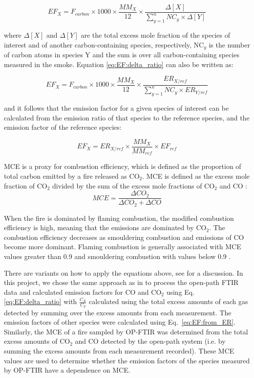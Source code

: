 \documentclass[acp, manuscript]{copernicus}
\begin{document}
\begin{equation} \label{eq:EF:delta_ratio}
EF_X = F_{carbon} \times 1000 \times \frac{MM_X}{12} \times \frac{\Delta[X]}{\sum_{y=1}^{n} NC_y \times \Delta[Y]}
\end{equation}

where $\Delta[X]$ and $\Delta[Y]$ are the total excess mole fraction of the species of interest and of another carbon-containing species, respectively, NC$_y$ is the number of carbon atoms in species Y and the sum is over all carbon-containing species measured in the smoke. 
Equation \ref{eq:EF:delta_ratio} can also be written as:

\begin{equation}
EF_X = F_{carbon} \times 1000 \times \frac{MM_X}{12} \times \frac{ER_{X/ref}}{\sum_{y=1}^{n} NC_y \times ER_{Y/ref}}
\end{equation}

and it follows that the emission factor for a given species of interest can be calculated from the emission ratio of that species to the reference species, and the emission factor of the reference species:

\begin{equation} \label{eq:EF:from_ER}
EF_X = ER_{X/ref} \times \frac{MM_X}{MM_{ref}} \times EF_{ref}
\end{equation}


MCE is a proxy for combustion efficiency, which is defined as the proportion of total carbon emitted by a fire released as CO$_2$. MCE is defined as the excess mole fraction of CO$_2$ divided by the sum of the excess mole fractions of CO$_2$ and CO \citep{Hao1993,Yokelson1996}:
\begin{equation} \label{eq:MCE}
MCE = \frac{\Delta CO_2}{\Delta CO_2 + \Delta CO}
\end{equation}
 
When the fire is dominated by flaming combustion, the modified combustion efficiency is high, meaning that the emissions are dominated by CO$_2$. The combustion efficiency decreases as smouldering combustion and emissions of CO become more dominant. Flaming combustion is generally associated with MCE values greater than 0.9 and smouldering combustion with values below 0.9 \citep{Yokelson1996, Bertschi2003}.

There are variants on how to apply the equations above, see \citet{Paton-Walsh2014} for a discussion. In this project, we chose the same approach as in \citet{Paton-Walsh2014} to process the open-path FTIR data and calculated emission factors for CO and CO$_2$ using Eq. \ref{eq:EF:delta_ratio} with $ \frac{C_X}{C_T} $ calculated using the total excess amounts of each gas detected by summing over the excess amounts from each measurement. The emission factors of other species were calculated using Eq.~\ref{eq:EF:from_ER}.
Similarly, the MCE of a fire sampled by OP-FTIR was determined from the total excess amounts of CO$_2$ and CO detected by the open-path system (i.e. by summing the excess amounts from each measurement recorded). These MCE values are used to determine whether the emission factors of the species measured by OP-FTIR have a dependence on MCE. 
\end{document}
